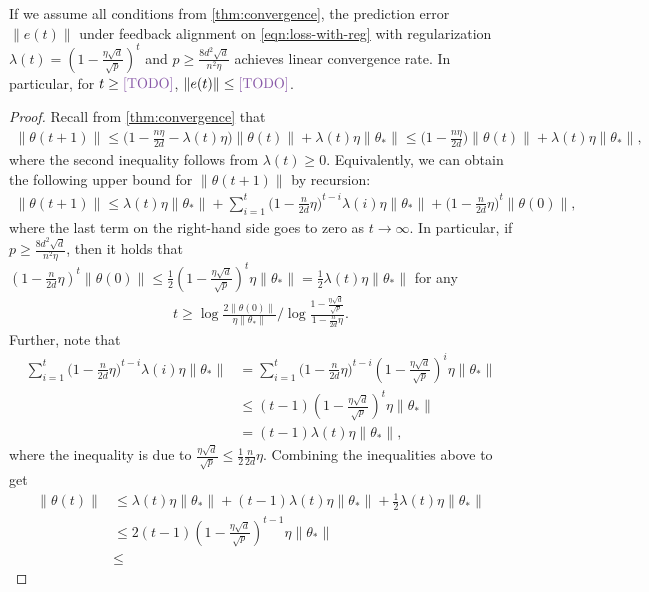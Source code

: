 \begin{corollary}\label{cor:convergence-with-decreasing-reg}
    If we assume all conditions from \cref{thm:convergence}, the prediction error $\|e(t)\|$ under feedback alignment on \eqref{eqn:loss-with-reg} with regularization $\lambda(t) = \left(1-\frac{\eta\sqrt{d}}{\sqrt{p}}\right)^t$ and $p \geq \frac{8d^2\sqrt{d}}{n^2\eta}$ achieves linear convergence rate. In particular, for $t\geq \icomment{TODO}$, $\|e(t)\| \leq \icomment{TODO}$.
\end{corollary}

\begin{proof}
    Recall from \cref{thm:convergence} that 
    \begin{align*}
        \|\theta(t+1)\| \leq \Big(1-\frac{n\eta}{2d}- \lambda(t)\eta \Big)\|\theta(t)\| + \lambda(t)\eta\|\theta_\ast\| \leq \Big(1-\frac{n\eta}{2d} \Big)\|\theta(t)\| + \lambda(t)\eta\|\theta_\ast\|,
    \end{align*}
    where the second inequality follows from $\lambda(t)\geq 0$. Equivalently, we can obtain the following upper bound for $\|\theta(t+1)\|$ by recursion:
    \begin{align*}
        \|\theta(t+1)\| \leq \lambda(t)\eta \|\theta_*\| + \sum_{i=1}^t \Big( 1-\frac{n}{2d}\eta \Big)^{t-i} \lambda(i)\eta \|\theta_*\| + \Big( 1-\frac{n}{2d}\eta \Big)^t \|\theta(0)\|,
    \end{align*}
    where the last term on the right-hand side goes to zero as $t\to\infty$. In particular, if $p \geq \frac{8d^2\sqrt{d}}{n^2\eta}$, then it holds that $\left( 1-\frac{n}{2d}\eta \right)^t \|\theta(0)\| \leq \frac{1}{2} \left( 1-\frac{\eta\sqrt{d}}{\sqrt{p}} \right)^t \eta \|\theta_*\| = \frac{1}{2}\lambda(t)\eta \|\theta_*\|$ for any 
    \begin{align*}
        t \geq \log\frac{2\|\theta(0)\|}{\eta\|\theta_*\|} / \log \frac{1-\frac{\eta\sqrt{d}}{\sqrt{p}}}{1 - \frac{n}{2d}\eta}.
    \end{align*}
    Further, note that 
    \begin{align*}
        \sum_{i=1}^t \Big( 1-\frac{n}{2d}\eta \Big)^{t-i} \lambda(i)\eta \|\theta_*\| & = \sum_{i=1}^t \Big( 1-\frac{n}{2d}\eta \Big)^{t-i} \left(1-\frac{\eta\sqrt{d}}{\sqrt{p}}\right)^i \eta \|\theta_*\| \\
        & \leq (t-1) \left(1-\frac{\eta\sqrt{d}}{\sqrt{p}}\right)^t \eta \|\theta_*\| \\
        & = (t-1)\lambda(t)\eta \|\theta_*\|,
    \end{align*}
    where the inequality is due to $\frac{\eta\sqrt{d}}{\sqrt{p}} \leq \frac{1}{2}\frac{n}{2d}\eta$. Combining the inequalities above to get
    \begin{align*}
        \|\theta(t)\| & \leq  \lambda(t)\eta \|\theta_*\| + (t-1)\lambda(t)\eta \|\theta_*\| + \frac{1}{2}\lambda(t)\eta \|\theta_*\| \\
        & \leq 2(t-1) \left(1-\frac{\eta\sqrt{d}}{\sqrt{p}}\right)^{t-1} \eta \|\theta_*\| \\
        & \leq 
    \end{align*}
\end{proof}

